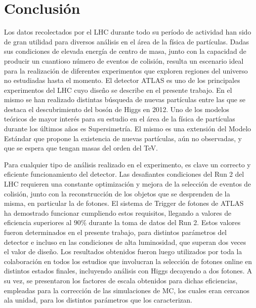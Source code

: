 \chapter{Conclusión}

Los datos recolectados por el LHC durante todo su período de actividad han sido de gran utilidad para diversos análisis en el área de la física de partículas. Dadas sus condiciones de elevada energía de centro de masa, junto con la capacidad de producir un cuantioso número de eventos de colisión, resulta un escenario ideal para la realización de diferentes experimentos que exploren regiones del universo no estudiadas hasta el momento. El detector ATLAS es uno de los principales experimentos del LHC cuyo diseño se describe en el presente trabajo. En el mismo se han realizado distintas búsqueda de nuevas partículas entre las que se destaca el descubrimiento del bosón de Higgs en 2012. Uno de los modelos teóricos de mayor interés para su estudio en el área de la física de partículas durante los últimos años es Supersimetría. El mismo es una extensión del Modelo Estándar que propone la existencia de nuevas partículas, aún no observadas, y que se espera que tengan masas del orden del TeV. 


Para cualquier tipo de análisis realizado en el experimento, es clave un correcto y eficiente funcionamiento del detector. Las desafiantes condiciones del Run 2 del LHC requieren una constante optimización y mejora de la selección de eventos de colisión, junto con la reconstrucción de los objetos que se desprenden de la misma, en particular la de fotones.
El sistema de Trigger de fotones de ATLAS ha demostrado funcionar cumpliendo estos requisitos, llegando a valores de eficiencia superiores al $90\%$ durante la toma de datos del Run 2. Estos valores fueron determinados en el presente trabajo, para distintos parámetros del detector e incluso en las condiciones de alta luminosidad, que superan dos veces el valor de diseño. Los resultados obtenidos fueron luego utilizados por toda la colaboración en todos los estudios que involucran la selección de fotones online en distintos estados finales, incluyendo análisis con Higgs decayendo a dos fotones. A su vez, se presentaron los factores de escala obtenidos para dichas eficiencias, empleadas para la corrección de las simulaciones de MC, los cuales eran cercanos ala unidad, para los distintos parámetros que los caracterizan.

